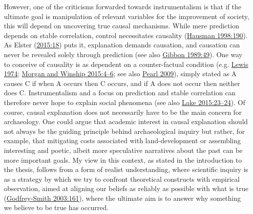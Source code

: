\documentclass[
  12pt,
  a4paper,
  oneside]{book}
\begin{document}
However, one of the criticisms forwarded towards instrumentalism is that if the ultimate goal is manipulation of relevant variables for the improvement of society, this will depend on uncovering true causal mechanisms. While mere prediction depends on stable correlation, control necessitates causality (\protect\hyperlink{ref-hausman1998}{Hausman 1998:190}). As Elster (\protect\hyperlink{ref-elster2015}{2015:18}) puts it, explanation demands causation, and causation can never be revealed solely through prediction (see also \protect\hyperlink{ref-gibbon1989}{Gibbon 1989:49}). One way to conceive of causality is as dependent on a counter-factual condition (e.g. \protect\hyperlink{ref-lewis1974}{Lewis 1974}; \protect\hyperlink{ref-morgan2015}{Morgan and Winship 2015:4--6}; see also \protect\hyperlink{ref-pearl2009}{Pearl 2009}), simply stated as A causes C if when A occurs then C occurs, and if A does not occur then neither does C. Instrumentalism and a focus on prediction and stable correlation can therefore never hope to explain social phenomena (see also \protect\hyperlink{ref-lake2015}{Lake 2015:23--24}). Of course, causal explanation does not necessarily have to be the main concern for archaeology. One could argue that academic interest in causal explanation should not always be the guiding principle behind archaeological inquiry but rather, for example, that mitigating costs associated with land-development or assembling interesting and poetic, albeit more speculative narratives about the past can be more important goals. My view in this context, as stated in the introduction to the thesis, follows from a form of realist understanding, where scientific inquiry is as a strategy by which we try to confront theoretical constructs with empirical observation, aimed at aligning our beliefs as reliably as possible with what is true (\protect\hyperlink{ref-godfrey-smith2003}{Godfrey-Smith 2003:161}), where the ultimate aim is to answer why something we believe to be true has occurred.
\end{document}
